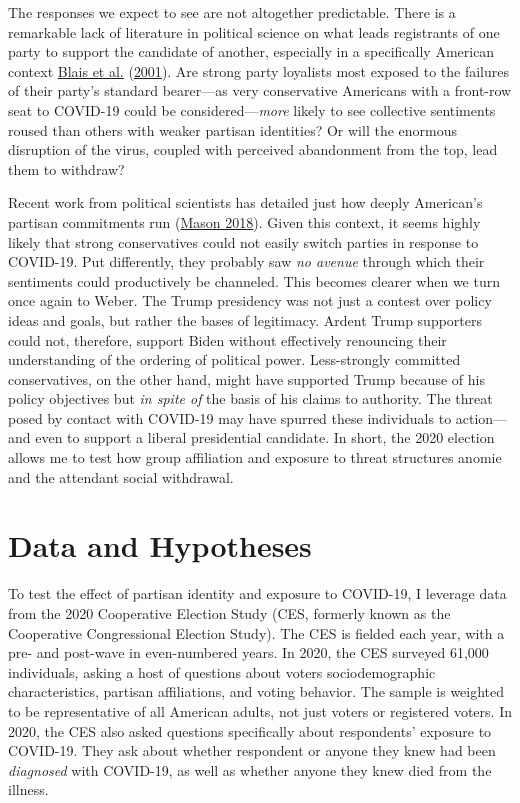 \documentclass[
  12pt,
]{article}
\begin{document}
The responses we expect to see are not altogether predictable. There is a remarkable lack of literature in political science on what leads registrants of one party to support the candidate of another, especially in a specifically American context \protect\hyperlink{ref-Blais2001}{Blais et al.} (\protect\hyperlink{ref-Blais2001}{2001}). Are strong party loyalists most exposed to the failures of their party's standard bearer---as very conservative Americans with a front-row seat to COVID-19 could be considered---\emph{more} likely to see collective sentiments roused than others with weaker partisan identities? Or will the enormous disruption of the virus, coupled with perceived abandonment from the top, lead them to withdraw?

Recent work from political scientists has detailed just how deeply American's partisan commitments run (\protect\hyperlink{ref-Mason2018}{Mason 2018}). Given this context, it seems highly likely that strong conservatives could not easily switch parties in response to COVID-19. Put differently, they probably saw \emph{no avenue} through which their sentiments could productively be channeled. This becomes clearer when we turn once again to Weber. The Trump presidency was not just a contest over policy ideas and goals, but rather the bases of legitimacy. Ardent Trump supporters could not, therefore, support Biden without effectively renouncing their understanding of the ordering of political power. Less-strongly committed conservatives, on the other hand, might have supported Trump because of his policy objectives but \emph{in spite of} the basis of his claims to authority. The threat posed by contact with COVID-19 may have spurred these individuals to action---and even to support a liberal presidential candidate. In short, the 2020 election allows me to test how group affiliation and exposure to threat structures anomie and the attendant social withdrawal.

\hypertarget{data-and-hypotheses}{%
\section*{Data and Hypotheses}\label{data-and-hypotheses}}

To test the effect of partisan identity and exposure to COVID-19, I leverage data from the 2020 Cooperative Election Study (CES, formerly known as the Cooperative Congressional Election Study). The CES is fielded each year, with a pre- and post-wave in even-numbered years. In 2020, the CES surveyed 61,000 individuals, asking a host of questions about voters sociodemographic characteristics, partisan affiliations, and voting behavior. The sample is weighted to be representative of all American adults, not just voters or registered voters. In 2020, the CES also asked questions specifically about respondents' exposure to COVID-19. They ask about whether respondent or anyone they knew had been \emph{diagnosed} with COVID-19, as well as whether anyone they knew died from the illness.
\end{document}
